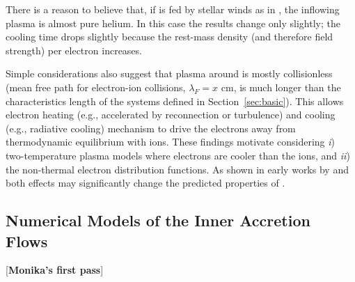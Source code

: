 There is a reason to believe that, if \sgra is fed by stellar winds as
in \citet{2019MNRAS.482L.123R}, the inflowing plasma is almost pure
helium. In this case the results change only slightly; the cooling time drops
slightly because the rest-mass density (and therefore field strength)
per electron increases.

Simple considerations also suggest that plasma around \sgra is mostly collisionless (mean free path for electron-ion collisions, $\lambda_F=x$ cm, is much longer than the characteristics length of the systems defined in Section~\ref{sec:basic}).
This allows electron heating (e.g., accelerated by reconnection or turbulence) and
cooling (e.g., radiative cooling) mechanism to drive the electrons
away from thermodynamic equilibrium with ions.
These findings motivate considering \emph{i}) two-temperature plasma models where electrons are cooler than the
ions, and \emph{ii}) the non-thermal electron distribution functions.
As shown in early works by
\citet{1998ApJ...492..554N} and \citet{2000ApJ...541..234O} both
effects may significantly change the predicted properties of \sgra.








\subsection{Numerical Models of the Inner Accretion Flows}

\color{red}
[{\bf Monika's first pass}]
\color{black}

